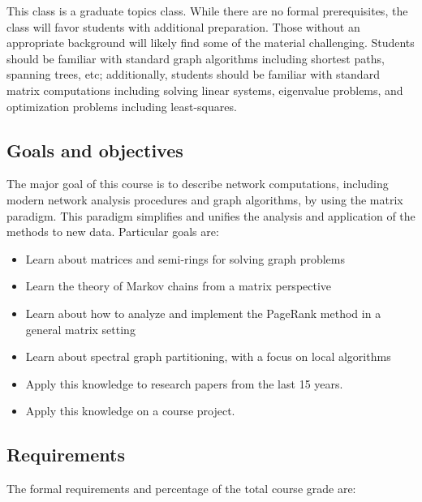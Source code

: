 \documentclass{article}
\begin{document}
This class is a graduate topics class. While there are no formal prerequisites, the class will favor students with additional preparation. Those without an appropriate background will likely find some of the material challenging. Students should be familiar with standard graph algorithms including shortest paths, spanning trees, etc; additionally, students should be familiar with standard matrix computations including solving linear systems, eigenvalue problems, and optimization problems including least-squares.

\hypertarget{goals_and_objectives_6}{}\subsection*{{Goals and objectives}}\label{goals_and_objectives_6}

The major goal of this course is to describe network computations, including modern network analysis procedures and graph algorithms, by using the matrix paradigm. This paradigm simplifies and unifies the analysis and application of the methods to new data. Particular goals are:

\begin{itemize}%
\item Learn about matrices and semi-rings for solving graph problems
\item Learn the theory of Markov chains from a matrix perspective
\item Learn about how to analyze and implement the PageRank method in a general matrix setting
\item Learn about spectral graph partitioning, with a focus on local algorithms
\item Apply this knowledge to research papers from the last 15 years.
\item Apply this knowledge on a course project.

\end{itemize}
\hypertarget{requirements_7}{}\subsection*{{Requirements}}\label{requirements_7}

The formal requirements and percentage of the total course grade are:
\end{document}
